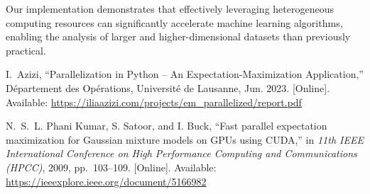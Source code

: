 \documentclass[conference]{IEEEtran}
\begin{document}
Our implementation demonstrates that effectively leveraging heterogeneous computing resources can significantly accelerate machine learning algorithms, enabling the analysis of larger and higher-dimensional datasets than previously practical.


\begin{thebibliography}{11}

I.~Azizi, ``Parallelization in Python -- An Expectation-Maximization Application,'' Département des Opérations, Université de Lausanne, Jun. 2023. [Online]. Available: \url{https://iliaazizi.com/projects/em_parallelized/report.pdf}

N.~S.~L. Phani Kumar, S. Satoor, and I. Buck, ``Fast parallel expectation maximization for Gaussian mixture models on GPUs using CUDA,'' in \emph{11th IEEE International Conference on High Performance Computing and Communications (HPCC)}, 2009, pp.~103--109. [Online]. Available: \url{https://ieeexplore.ieee.org/document/5166982}

\end{thebibliography}
\end{document}
